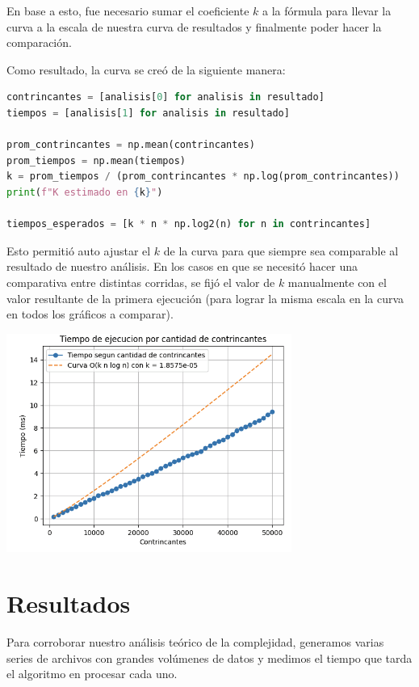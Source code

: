 \documentclass{estilo}
\begin{document}
En base a esto, fue necesario sumar el coeficiente $k$ a la fórmula para llevar la curva a la escala de nuestra curva de resultados y finalmente poder hacer la comparación.

Como resultado, la curva se creó de la siguiente manera:

\begin{lstlisting}[language=Python]
contrincantes = [analisis[0] for analisis in resultado]
tiempos = [analisis[1] for analisis in resultado]

prom_contrincantes = np.mean(contrincantes)
prom_tiempos = np.mean(tiempos)
k = prom_tiempos / (prom_contrincantes * np.log(prom_contrincantes))
print(f"K estimado en {k}")

tiempos_esperados = [k * n * np.log2(n) for n in contrincantes]
\end{lstlisting}

Esto permitió auto ajustar el $k$ de la curva para que siempre sea comparable al resultado de nuestro análisis. En los casos en que se necesitó hacer una comparativa entre distintas corridas, se fijó el valor de $k$ manualmente con el valor resultante de la primera ejecución (para lograr la misma escala en la curva en todos los gráficos a comparar).
\begin{center}
\includegraphics[width=0.7\textwidth]{img/Kcurve.png}
\end{center}
\section{Resultados}

Para corroborar nuestro análisis teórico de la complejidad, generamos varias series de archivos con grandes volúmenes de datos y medimos el tiempo que tarda el algoritmo en procesar cada uno.
\end{document}
